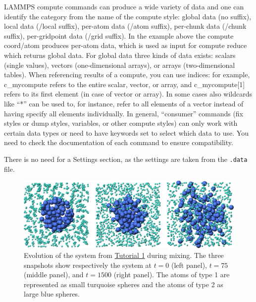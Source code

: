 \documentclass[9pt,tutorial]{livecoms}
\newcommand{\lmpcmd}[1]{\colorbox{listing}{\textcolor{command}{\small{#1}}}} %
\newcommand{\flecmd}[1]{\textcolor{command}{\texttt{#1}}} %
\begin{document}
\begin{note}
  {\color{blue} LAMMPS \lmpcmd{compute} commands can produce
    a wide variety of data and one can identify the category from the
    name of the compute style: global data (no suffix), local data
    (/local suffix), per-atom data (/atom suffix), per-chunk data
    (/chunk suffix), per-gridpoint data (/grid suffix).  In the example
    above the \lmpcmd{compute coord/atom} produces per-atom data, which
    is used as input for \lmpcmd{compute reduce} which returns global
    data.  For global data three kinds of data exists: scalars (single
    values), vectors (one-dimensional arrays), or arrays
    (two-dimensional tables).  When referencing results of a compute,
    you can use indices: for example, \lmpcmd{c\_mycompute} refers to
    the entire scalar, vector, or array, and \lmpcmd{c\_mycompute[1]}
    refers to its first element (in case of vector or array).  In some
    cases also wildcards like ``*'' can be used to, for instance, refer to all elements
    of a vector instead of having specify all elements individually.
    In general, ``consumer'' commands (fix styles or dump styles,
    variables, or other compute styles) can only work with certain data
    types or need to have keywords set to select which data to use.
    You need to check the documentation of each command to ensure
    compatibility.}
\end{note}

\begin{note}
There is no need for a \lmpcmd{Settings}
section, as the settings are taken from the \flecmd{.data} file.
\end{note}

\begin{figure}
\centering
\includegraphics[width=\linewidth]{LJ-evolution}
\caption{Evolution of the system from \hyperref[lennard-jones-label]{Tutorial 1}
during mixing.  The three snapshots show respectively the system
at $t=0$ (left panel), $t=75$ (middle panel), and $t=1500$ (right panel).  The
atoms of type 1 are represented as small turquoise spheres and the atoms of type 2
as large blue spheres.}
\label{fig:evolution-population}
\end{figure}
\end{document}
